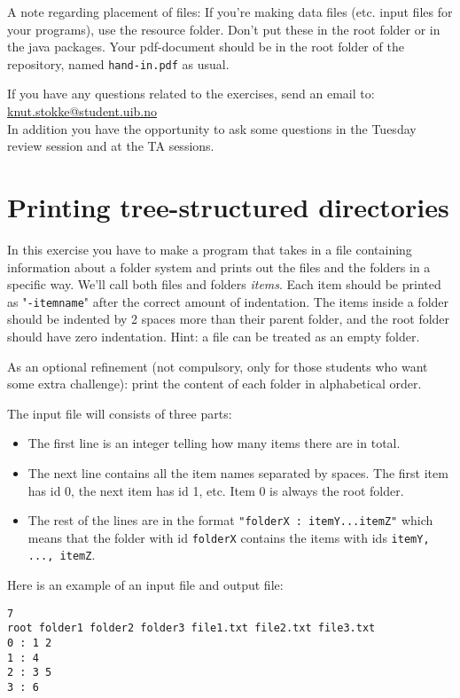\documentclass[11pt]{article}
\begin{document}
    A note regarding placement of files: If you're making data files (etc. input files for your programs), use the resource folder. Don't put these in the root folder or in the java packages. Your pdf-document should be in the root folder of the repository, named \texttt{hand-in.pdf} as usual.

    If you have any questions related to the exercises, send an email to: \\
    \mbox{\url{knut.stokke@student.uib.no}} \\
    In addition you have the opportunity to ask some questions in the Tuesday review session and at the TA sessions.

    \newpage


    \section{Printing tree-structured directories}
    In this exercise you have to make a program that takes in a file containing information about a folder system and prints out the files and the folders in a specific way. We'll call both files and folders \emph{items}. Each item should be printed as "\texttt{\textquotesingle-itemname}" after the correct amount of indentation. The items inside a folder should be indented by 2 spaces more than their parent folder, and the root folder should have zero indentation.
Hint: a file can be treated as an empty folder.

As an optional refinement (not compulsory, only for those students who want
some extra challenge):
print the content of each folder in alphabetical order.

    The input file will consists of three parts:
    \begin{itemize}
      \item The first line is an integer telling how many items there are in total.
      \item The next line contains all the item names separated by spaces. The first item has id 0, the next item has id 1, etc. Item 0 is always the root folder.
      \item The rest of the lines are in the format
\texttt{"folderX : itemY...itemZ"} which means that the folder with id
\texttt{folderX} contains the items with ids \texttt{itemY, ..., itemZ}.
    \end{itemize}

    Here is an example of an input file and output file:

    \begin{lstlisting}[frame=single]
7
root folder1 folder2 folder3 file1.txt file2.txt file3.txt
0 : 1 2
1 : 4
2 : 3 5
3 : 6
    \end{lstlisting}
\end{document}
